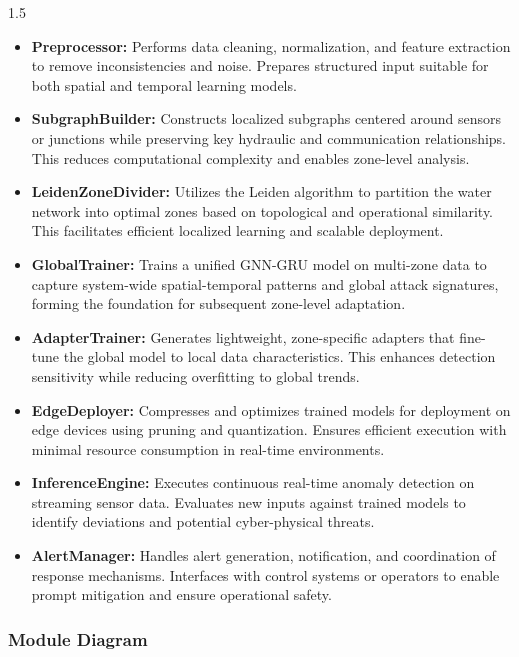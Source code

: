 \begin{spacing}{1.5}
\begin{itemize}
    \item \textbf{Preprocessor:}  
    Performs data cleaning, normalization, and feature extraction to remove inconsistencies and noise. Prepares structured input suitable for both spatial and temporal learning models.

    \item \textbf{SubgraphBuilder:}  
    Constructs localized subgraphs centered around sensors or junctions while preserving key hydraulic and communication relationships. This reduces computational complexity and enables zone-level analysis.

    \item \textbf{LeidenZoneDivider:}  
    Utilizes the Leiden algorithm to partition the water network into optimal zones based on topological and operational similarity. This facilitates efficient localized learning and scalable deployment.

    \item \textbf{GlobalTrainer:}  
    Trains a unified GNN-GRU model on multi-zone data to capture system-wide spatial-temporal patterns and global attack signatures, forming the foundation for subsequent zone-level adaptation.

    \item \textbf{AdapterTrainer:}  
    Generates lightweight, zone-specific adapters that fine-tune the global model to local data characteristics. This enhances detection sensitivity while reducing overfitting to global trends.

    \item \textbf{EdgeDeployer:}  
    Compresses and optimizes trained models for deployment on edge devices using pruning and quantization. Ensures efficient execution with minimal resource consumption in real-time environments.

    \item \textbf{InferenceEngine:}  
    Executes continuous real-time anomaly detection on streaming sensor data. Evaluates new inputs against trained models to identify deviations and potential cyber-physical threats.

    \item \textbf{AlertManager:}  
    Handles alert generation, notification, and coordination of response mechanisms. Interfaces with control systems or operators to enable prompt mitigation and ensure operational safety.
\end{itemize}


\subsubsection{Module Diagram}


\end{spacing}
